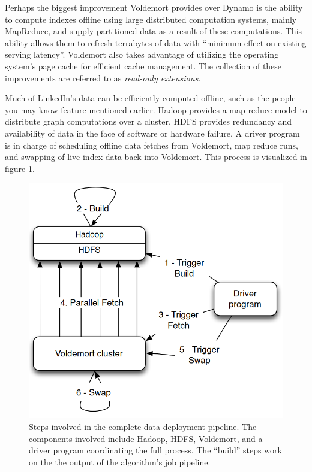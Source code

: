 \documentclass[]{article}
\begin{document}
Perhaps the biggest improvement Voldemort provides over Dynamo is the ability to compute indexes offline using large distributed computation systems, mainly MapReduce, and supply partitioned data as a result of these computations. This ability allows them to refresh terrabytes of data with ``minimum effect on existing serving latency''. Voldemort also takes advantage of utilizing the operating system's page cache for efficient cache management. The collection of these improvements are referred to as \textit{read-only extensions}.

Much of LinkedIn's data can be efficiently computed offline, such as the people you may know feature mentioned earlier. Hadoop provides a map reduce model to distribute graph computations over a cluster. HDFS provides redundancy and availability of data in the face of software or hardware failure. A driver program is in charge of scheduling offline data fetches from Voldemort, map reduce runs, and swapping of live index data back into Voldemort. This process is visualized in figure \ref{fig:voldemort}. 

\begin{figure}
    \centering
    \includegraphics[width=0.7\linewidth]{img/voldemort}
    \caption[Voldemort data deployment pipeline.]{Steps involved in the complete data deployment pipeline. The components involved include Hadoop, HDFS, Voldemort, and a driver program coordinating the full process. The ``build'' steps work on the the output of the algorithm's job pipeline. \cite{Sumbaly:2012:SLB:2208461.2208479}}
    \label{fig:voldemort}
\end{figure}
\end{document}
